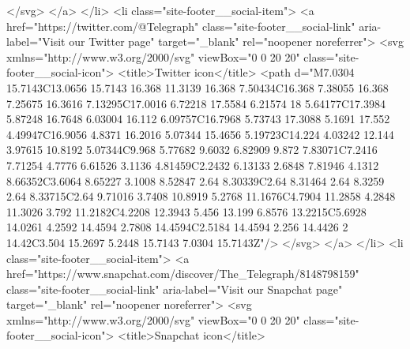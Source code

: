{{{</svg>
</a>
</li>
<li class="site-footer__social-item">
<a href="https://twitter.com/@Telegraph" class="site-footer__social-link" aria-label="Visit our Twitter page" target="_blank" rel="noopener noreferrer">
<svg xmlns="http://www.w3.org/2000/svg" viewBox="0 0 20 20" class="site-footer__social-icon">
<title>Twitter icon</title>
<path d="M7.0304 15.7143C13.0656 15.7143 16.368 11.3139 16.368 7.50434C16.368 7.38055 16.368 7.25675 16.3616 7.13295C17.0016 6.72218 17.5584 6.21574 18 5.64177C17.3984 5.87248 16.7648 6.03004 16.112 6.09757C16.7968 5.73743 17.3088 5.1691 17.552 4.49947C16.9056 4.8371 16.2016 5.07344 15.4656 5.19723C14.224 4.03242 12.144 3.97615 10.8192 5.07344C9.968 5.77682 9.6032 6.82909 9.872 7.83071C7.2416 7.71254 4.7776 6.61526 3.1136 4.81459C2.2432 6.13133 2.6848 7.81946 4.1312 8.66352C3.6064 8.65227 3.1008 8.52847 2.64 8.30339C2.64 8.31464 2.64 8.3259 2.64 8.33715C2.64 9.71016 3.7408 10.8919 5.2768 11.1676C4.7904 11.2858 4.2848 11.3026 3.792 11.2182C4.2208 12.3943 5.456 13.199 6.8576 13.2215C5.6928 14.0261 4.2592 14.4594 2.7808 14.4594C2.5184 14.4594 2.256 14.4426 2 14.42C3.504 15.2697 5.2448 15.7143 7.0304 15.7143Z"/>
</svg>
</a>
</li>
<li class="site-footer__social-item">
<a href="https://www.snapchat.com/discover/The_Telegraph/8148798159" class="site-footer__social-link" aria-label="Visit our Snapchat page" target="_blank" rel="noopener noreferrer">
<svg xmlns="http://www.w3.org/2000/svg" viewBox="0 0 20 20" class="site-footer__social-icon">
<title>Snapchat icon</title>
}}}
